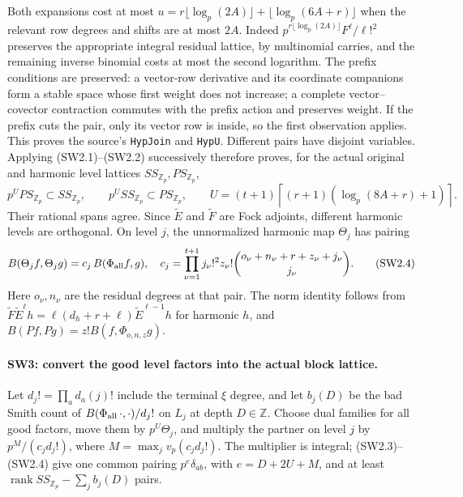 \documentclass[11pt,a4paper]{article}
\numberwithin{equation}{section}
\theoremstyle{remark}\newtheorem{remark}[theorem]{Remark}
\begin{document}
Both expansions cost at most
$u=r\lfloor\log_p(2A)\rfloor+\lfloor\log_p(6A+r)\rfloor$
when the relevant row degrees and shifts are at most $2A$.
Indeed $p^{r\lfloor\log_p(2A)\rfloor}F^\ell/\ell!^2$ preserves the
appropriate integral residual lattice, by multinomial carries, and the
remaining inverse binomial costs at most the second logarithm.
The prefix conditions are preserved: a vector-row derivative and its
coordinate companions form a stable space whose first weight does not
increase; a complete vector--covector contraction commutes with the prefix
action and preserves weight. If the prefix cuts the pair, only its vector
row is inside, so the first observation applies.
This proves the source's \texttt{HypJoin} and \texttt{HypU}.
Different pairs have disjoint variables. Applying (SW2.1)--(SW2.2) successively
therefore proves, for the actual original and harmonic level lattices
$SS_{\mathbb Z_p},PS_{\mathbb Z_p}$,
\[
 p^U PS_{\mathbb Z_p}\subset SS_{\mathbb Z_p},\qquad
 p^U SS_{\mathbb Z_p}\subset PS_{\mathbb Z_p},\qquad
 U=(t+1)\left\lceil(r+1)(\log_p(8A+r)+1)\right\rceil.
 \tag{SW2.3}
\]
Their rational spans agree. Since $\widetilde E$ and $\widetilde F$ are
Fock adjoints, different harmonic levels are orthogonal. On level $j$,
the unnormalized harmonic map $\Theta_j$ has pairing
\[
 B(\Theta_jf,\Theta_jg)=c_j\,B(\Phi_{\rm all}f,g),\quad
 c_j=\prod_{\nu=1}^{t+1}
 j_\nu!^2 z_\nu!\binom{o_\nu+n_\nu+r+z_\nu+j_\nu}{j_\nu}.
 \tag{SW2.4}
\]
Here $o_\nu,n_\nu$ are the residual degrees at that pair.
The norm identity follows from
$\widetilde F\widetilde E^\ell h
=\ell(d_h+r+\ell)\widetilde E^{\ell-1}h$
for harmonic $h$, and
$B(Pf,Pg)=z!B(f,\Phi_{o,n,z}g)$.

\paragraph{SW3: convert the good level factors into the actual block lattice.}
Let $d_j!=\prod_a d_a(j)!$ include the terminal $\xi$ degree, and let
$b_j(D)$ be the bad Smith count of
$B(\Phi_{\rm all}\,\cdot,\cdot)/d_j!$ on $L_j$ at depth $D\in\mathbb Z$.
Choose dual families for all good factors, move them by $p^U\Theta_j$,
and multiply the partner on level $j$ by
$p^M/(c_jd_j!)$, where $M=\max_j v_p(c_jd_j!)$.
The multiplier is integral; (SW2.3)--(SW2.4) give one common pairing
$p^e\delta_{ab}$, with $e=D+2U+M$, and at least
$\operatorname{rank}SS_{\mathbb Z_p}-\sum_jb_j(D)$ pairs.
\end{document}
